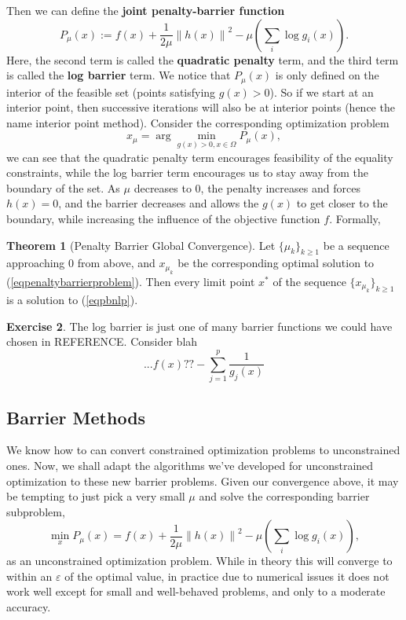 \documentclass[11pt]{article}
\numberwithin{equation}{section}
\theoremstyle{definition}
\newtheorem{theorem}{Theorem}[section]
\newtheorem{exercise}[theorem]{Exercise}
\newcommand{\norm}[1]{\left\lVert#1\right\rVert}
\begin{document}
Then we can define the \textbf{joint penalty-barrier function}
\begin{equation}
    P_\mu(x):=f(x)+\frac1{2\mu}\norm{h(x)}^2-\mu\left(\sum_i\log g_i(x)\right).
\end{equation}
Here, the second term is called the \textbf{quadratic penalty} term, and the third term is called the \textbf{log barrier} term. We notice that $P_\mu(x)$ is only defined on the interior of the feasible set (points satisfying $g(x)>0$). So if we start at an interior point, then successive iterations will also be at interior points (hence the name interior point method). Consider the corresponding optimization problem
\begin{equation}
    \label{eqpenaltybarrierproblem}
    x_\mu=\arg\min_{g(x)>0,x\in\Omega}P_\mu(x),
\end{equation}
we can see that the quadratic penalty term encourages feasibility of the equality constraints, while the log barrier term encourages us to stay away from the boundary of the set. As $\mu$ decreases to $0$, the penalty increases and forces $h(x)=0$, and the barrier decreases and allows the $g(x)$ to get closer to the boundary, while increasing the influence of the objective function $f$. Formally,
\begin{theorem}[Penalty Barrier Global Convergence]
    Let $\{\mu_k\}_{k\ge1}$ be a sequence approaching $0$ from above, and $x_{\mu_k}$ be the corresponding optimal solution to (\ref{eqpenaltybarrierproblem}). Then every limit point $x^*$ of the sequence $\{x_{\mu_k}\}_{k\ge1}$ is a solution to (\ref{eqpbnlp}).
\end{theorem}

\begin{exercise}
The log barrier is just one of many barrier functions we could have chosen in REFERENCE. Consider blah
\begin{equation}
    ...f(x)??- \sum_{j=1}^p\frac1{g_j(x)}
\end{equation}
\end{exercise}
\subsection{Barrier Methods}
We know how to can convert constrained optimization problems to unconstrained ones. Now, we shall adapt the algorithms we've developed for unconstrained optimization to these new barrier problems. Given our convergence above, it may be tempting to just pick a very small $\mu$ and solve the corresponding barrier subproblem,
\begin{equation}
    \min_x P_\mu(x)=f(x)+\frac1{2\mu}\norm{h(x)}^2-\mu\left(\sum_i\log g_i(x)\right),
\end{equation}
as an unconstrained optimization problem. While in theory this will converge to within an $\varepsilon$ of the optimal value, in practice due to numerical issues it does not work well except for small and well-behaved problems, and only to a moderate accuracy.
\end{document}
